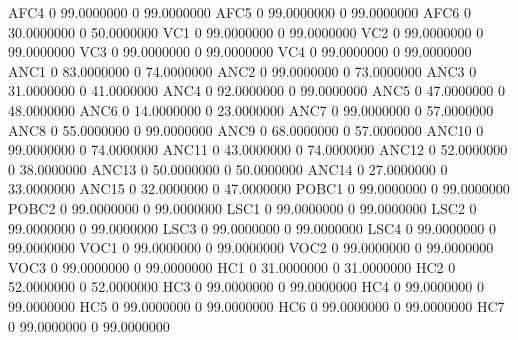 \documentclass[
  11pt,
  a4paper,
  DIV=12,captions=tableheading,oneside,titlepage]{scrbook}
\let\oldverbatim\verbatim
\let\endoldverbatim\endverbatim
\renewenvironment{verbatim}{\footnotesize\oldverbatim}{\endoldverbatim}
\begin{document}
\begin{verbatim}
  AFC4                   0    99.0000000             0    99.0000000 
  AFC5                   0    99.0000000             0    99.0000000 
  AFC6                   0    30.0000000             0    50.0000000 
  VC1                    0    99.0000000             0    99.0000000 
  VC2                    0    99.0000000             0    99.0000000 
  VC3                    0    99.0000000             0    99.0000000 
  VC4                    0    99.0000000             0    99.0000000 
  ANC1                   0    83.0000000             0    74.0000000 
  ANC2                   0    99.0000000             0    73.0000000 
  ANC3                   0    31.0000000             0    41.0000000 
  ANC4                   0    92.0000000             0    99.0000000 
  ANC5                   0    47.0000000             0    48.0000000 
  ANC6                   0    14.0000000             0    23.0000000 
  ANC7                   0    99.0000000             0    57.0000000 
  ANC8                   0    55.0000000             0    99.0000000 
  ANC9                   0    68.0000000             0    57.0000000 
  ANC10                  0    99.0000000             0    74.0000000 
  ANC11                  0    43.0000000             0    74.0000000 
  ANC12                  0    52.0000000             0    38.0000000 
  ANC13                  0    50.0000000             0    50.0000000 
  ANC14                  0    27.0000000             0    33.0000000 
  ANC15                  0    32.0000000             0    47.0000000 
  POBC1                  0    99.0000000             0    99.0000000 
  POBC2                  0    99.0000000             0    99.0000000 
  LSC1                   0    99.0000000             0    99.0000000 
  LSC2                   0    99.0000000             0    99.0000000 
  LSC3                   0    99.0000000             0    99.0000000 
  LSC4                   0    99.0000000             0    99.0000000 
  VOC1                   0    99.0000000             0    99.0000000 
  VOC2                   0    99.0000000             0    99.0000000 
  VOC3                   0    99.0000000             0    99.0000000 
  HC1                    0    31.0000000             0    31.0000000 
  HC2                    0    52.0000000             0    52.0000000 
  HC3                    0    99.0000000             0    99.0000000 
  HC4                    0    99.0000000             0    99.0000000 
  HC5                    0    99.0000000             0    99.0000000 
  HC6                    0    99.0000000             0    99.0000000 
  HC7                    0    99.0000000             0    99.0000000 

\end{verbatim}
\end{document}
